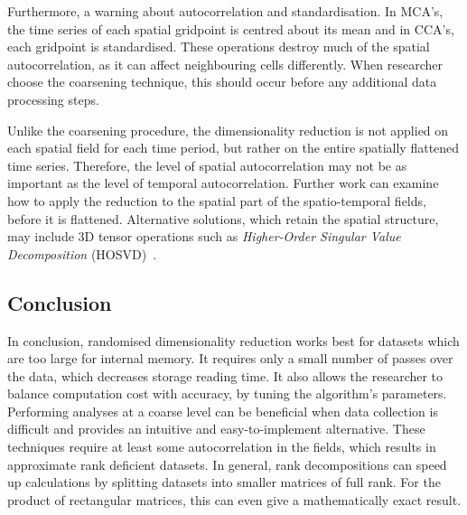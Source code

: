 \documentclass[ijgi,article,submit,moreauthors,pdftex,10pt,a4paper]{Definitions/mdpi}
\begin{document}
Furthermore, a warning about autocorrelation and standardisation. In MCA's, the time series of each spatial gridpoint is centred about its mean and in CCA's, each gridpoint is standardised. These operations destroy much of the spatial autocorrelation, as it can affect neighbouring cells differently. When researcher choose the coarsening technique, this should occur before any additional data processing steps.

Unlike the coarsening procedure, the dimensionality reduction is not applied on each spatial field for each time period, but rather on the entire spatially flattened time series. Therefore, the level of spatial autocorrelation may not be as important as the level of temporal autocorrelation. Further work can examine how to apply the reduction to the spatial part of the spatio-temporal fields, before it is flattened. Alternative solutions, which retain the spatial structure, may include 3D tensor operations such as \textit{Higher-Order Singular Value Decomposition} (HOSVD)~\cite{Tucker1964}.

\subsection{Conclusion}
\label{sec:Discussion/Summary} %

In conclusion, randomised dimensionality reduction works best for datasets which are too large for internal memory. It requires only a small number of passes over the data, which decreases storage reading time. It also allows the researcher to balance computation cost with accuracy, by tuning the algorithm's parameters. Performing analyses at a coarse level can be beneficial when data collection is difficult and provides an intuitive and easy-to-implement alternative. These techniques require at least some autocorrelation in the fields, which results in approximate rank deficient datasets. In general, rank decompositions can speed up calculations by splitting datasets into smaller matrices of full rank. For the product of rectangular matrices, this can even give a mathematically exact result.
\\ %

\end{document}
